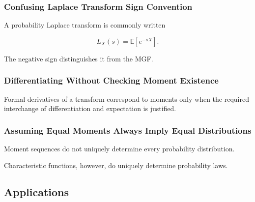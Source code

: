 \subsubsection{Confusing Laplace Transform Sign Convention}

A probability Laplace transform is commonly written

\[
\boxed{
L_X(s)
=
\mathbb{E}[e^{-sX}].
}
\]

The negative sign distinguishes it from the MGF.

\subsubsection{Differentiating Without Checking Moment Existence}

Formal derivatives of a transform correspond to moments only when the
required interchange of differentiation and expectation is justified.

\subsubsection{Assuming Equal Moments Always Imply Equal Distributions}

Moment sequences do not uniquely determine every probability
distribution.

Characteristic functions, however, do uniquely determine probability
laws.

\subsection{Applications}
\label{subsec:probability-transforms-applications}

